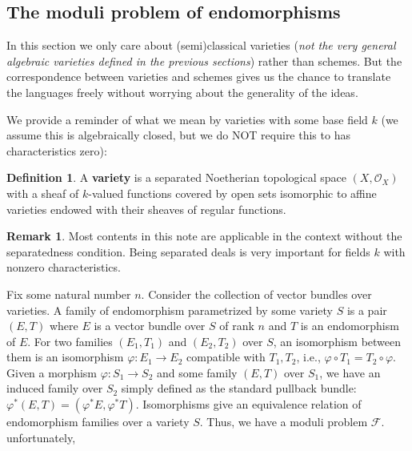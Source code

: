\documentclass[12pt]{article}
\theoremstyle{remark}
\theoremstyle{definition}
\newtheorem{remark}{Remark}[section]
\newtheorem{definition}{Definition}[section]
\begin{document}
    \subsection{The moduli problem of endomorphisms}
    In this section we only care about (semi)classical varieties (\textit{not the very general algebraic varieties defined in the previous sections}) rather than schemes. But the correspondence between varieties and schemes gives us the chance to translate the languages freely without worrying about the generality of the ideas.

    We provide a reminder of what we mean by varieties with some base field $k$ (we assume this is algebraically closed, but we do NOT require this to has characteristics zero):
    \begin{definition}
        A \textbf{variety} is a separated Noetherian topological space $(X,\mathcal O_X)$ with a sheaf of $k$-valued functions covered by open sets isomorphic to affine varieties endowed with their sheaves of regular functions.
    \end{definition}
    \begin{remark}
        Most contents in this note are applicable in the context without the separatedness condition. Being separated deals is very important for fields $k$ with nonzero characteristics.
    \end{remark}

    Fix some natural number $n$. Consider the collection of vector bundles over varieties. A family of endomorphism parametrized by some variety $S$ is a pair $(E, T)$ where $E$ is a vector bundle over $S$ of rank $n$ and $T$ is an endomorphism of $E$. For two families $(E_1, T_1)$ and $(E_2, T_2)$ over $S$, an isomorphism between them is an isomorphism $\varphi: E_1\to E_2$ compatible with $T_1, T_2$, i.e., $\varphi\circ T_1=T_2\circ\varphi$. Given a morphism $\varphi:S_1\to S_2$ and some family $(E, T)$ over $S_1$, we have an induced family over $S_2$ simply defined as the standard pullback bundle: $\varphi^*(E, T)=(\varphi^* E,\varphi^* T)$. Isomorphisms give an equivalence relation of endomorphism families over a variety $S$. Thus, we have a moduli problem $\mathcal F$. unfortunately,
\end{document}
